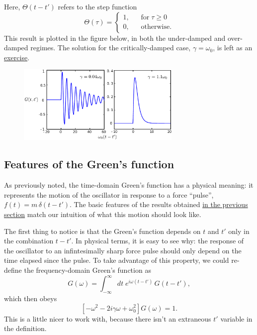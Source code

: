 \documentclass[10pt,a4paper]{article}
\begin{document}
Here, $\Theta(t-t')$ refers to the step function
\begin{equation}
  \Theta(\tau) = \left\{\begin{array}{ll} 1, &\;\;\;\textrm{for}
  \; \tau \ge 0\\ 0,&\;\;\; \textrm{otherwise.}\end{array}\right.
\end{equation}
This result is plotted in the figure below, in both the under-damped
and over-damped regimes. The solution for the critically-damped case,
$\gamma = \omega_0$, is left as an \hyperref[exercises]{exercise}.

\begin{figure}[h]
  \centering\includegraphics[width=0.7\textwidth]{oscillator_greenfun}
\end{figure}
    
\subsection{Features of the Green's function}
\label{features}

As previously noted, the time-domain Green's function has a physical
meaning: it represents the motion of the oscillator in response to a
force ``pulse'', $f(t) = m\, \delta(t-t')$. The basic features of the
results obtained \hyperref[finding-the-greens-function]{in the
  previous section} match our intuition of what this motion should
look like.

The first thing to notice is that the Green's function depends on $t$
and $t'$ only in the combination $t-t'$. In physical terms, it is easy
to see why: the response of the oscillator to an infintesimally sharp
force pulse should only depend on the time elapsed since the pulse. To
take advantage of this property, we could re-define the
frequency-domain Green's function as
\begin{equation}
  G(\omega) = \int_{-\infty}^\infty dt \; e^{i\omega (t-t')}\, G(t-t'),
\end{equation}
which then obeys
\begin{equation}
  \left[- \omega^2 - 2i \gamma\omega + \omega_0^2\right] G(\omega) = 1.
\end{equation}
This is a little nicer to work with, because there isn't an extraneous
$t'$ variable in the definition.
\end{document}
